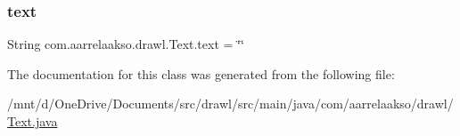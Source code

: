 \subsubsection{\texorpdfstring{text}{text}}
{\footnotesize\ttfamily String com.\+aarrelaakso.\+drawl.\+Text.\+text = \char`\"{}\char`\"{}\hspace{0.3cm}{\ttfamily [package]}}



The documentation for this class was generated from the following file\+:\begin{DoxyCompactItemize}
\item 
/mnt/d/\+One\+Drive/\+Documents/src/drawl/src/main/java/com/aarrelaakso/drawl/\hyperlink{_text_8java}{Text.\+java}\end{DoxyCompactItemize}
